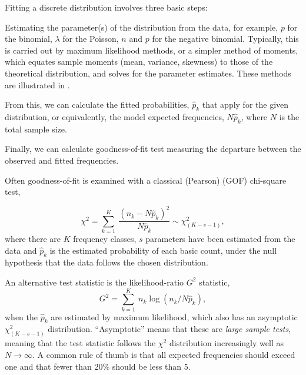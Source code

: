 \documentclass[11pt]{book}
\begin{document}
Fitting a discrete distribution involves three basic steps:
\begin{enumerate*}

\item Estimating the parameter(s) of the distribution from the
data, for example, $p$ for the binomial, $\lambda$ for the
Poisson, $n$ and $p$ for the negative binomial. Typically,
this is carried out by maximum likelihood methods, or a simpler
method of moments, which equates sample moments (mean, variance, skewness) to those of the theoretical distribution, and solves
for the parameter estimates.  These methods are illustrated in .

\item  From this, we can calculate the fitted probabilities,
$\hat{p}_k$ that apply for the given distribution,
or equivalently, the model expected frequencies,
$N \hat{p}_k$, where $N$ is the total sample size.

\item Finally, we can calculate goodness-of-fit test
measuring the departure between the observed and
fitted frequencies.
\end{enumerate*}

Often goodness-of-fit is examined with a classical (Pearson)
 (GOF) chi-square test,

\begin{equation}\label{eq:chi2}
  \chi^2 = \sum_{k=1}^K \:
  \frac{{ ( n_k - N \hat{p}_k ) }^2}
  { N \hat{p}_k }  \sim \chi^2_{( K-s-1 )}
  \comma
\end{equation}
where there are $K$ frequency classes, 
$s$ parameters have been estimated from the data and
\(\hat{p}_k\) is the estimated probability of each basic count,
under the null hypothesis that the data follows the chosen distribution.

An alternative test statistic is the likelihood-ratio $G^2$
statistic,
\begin{equation}\label{eq:g2}
 G^2 = \sum_{k=1}^K \: n_k \log ( n_k / N \hat{p}_k )
 \comma
\end{equation}
when the $\hat{p}_k$ are estimated by maximum likelihood,
which also has an asymptotic $\chi^2_{(K - s - 1)}$ distribution.
``Asymptotic'' means that these are \emph{large sample tests},
meaning that the test statistic follows the $\chi^2$ distribution
increasingly well as $N \rightarrow \infty$.
A common rule of thumb is that all expected frequencies
should exceed one and that fewer than 20\% should be less than 5.
\end{document}
